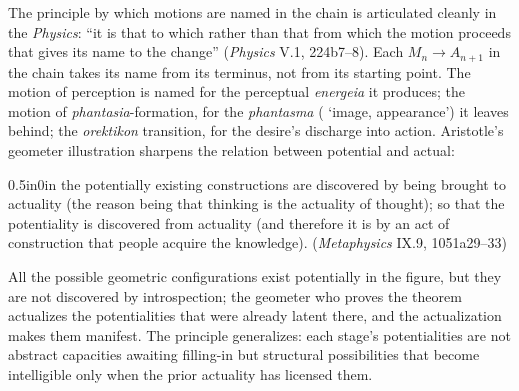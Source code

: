 The principle by which motions are named in the chain is articulated cleanly in the \textit{Physics}: ``it is that to which rather than that from which the motion proceeds that gives its name to the change'' (\textit{Physics} V.1, 224b7--8). Each $M_n \rightarrow A_{n+1}$ in the chain takes its name from its terminus, not from its starting point. The motion of perception is named for the perceptual \textit{energeia} it produces; the motion of \textit{phantasia}-formation, for the \textit{phantasma} ( `image, appearance') it leaves behind; the \textit{orektikon} transition, for the desire's discharge into action. Aristotle's geometer illustration sharpens the relation between potential and actual:
\begin{adjustwidth}{0.5in}{0in}
the potentially existing constructions are discovered by being brought to actuality (the reason being that thinking is the actuality of thought); so that the potentiality is discovered from actuality (and therefore it is by an act of construction that people acquire the knowledge). (\textit{Metaphysics} IX.9, 1051a29--33)
\end{adjustwidth}
All the possible geometric configurations exist potentially in the figure, but they are not discovered by introspection; the geometer who proves the theorem actualizes the potentialities that were already latent there, and the actualization makes them manifest. The principle generalizes: each stage's potentialities are not abstract capacities awaiting filling-in but structural possibilities that become intelligible only when the prior actuality has licensed them.

